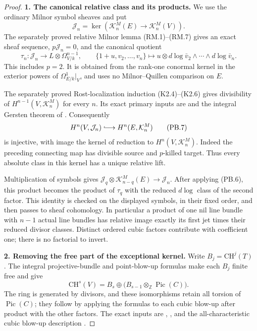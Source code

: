 \begin{proof}
\textbf{1. The canonical relative class and its products.}
We use the ordinary Milnor symbol sheaves and put
\[
 \mathcal J_n=\ker(\mathcal K_n^M(E)\longrightarrow\mathcal K_n^M(V)).
\]
The separately proved relative Milnor lemma (RM.1)--(RM.7) gives
an exact sheaf sequence, $p\mathcal J_n=0$, and the canonical quotient
\[
 \tau_n:\mathcal J_n\longrightarrow L\otimes\Omega^{n-1}_{V/k},
 \qquad
 \{1+u,v_2,\ldots,v_n\}\longmapsto
 u\otimes d\log\bar v_2\wedge\cdots\wedge d\log\bar v_n.
 \tag{PB.6}
\]
This includes $p=2$. It is obtained from the rank-one conormal
kernel in the exterior powers of $\Omega^1_{E/k}|_V$, and uses no
Milnor--Quillen comparison on $E$.

The separately proved Rost-localization induction (K2.4)--(K2.6)
gives divisibility of $H^{n-1}(V,\mathcal K_n^M)$ for every $n$.
Its exact primary inputs are
\citet[Section 5, Corollary 6.5, Proposition 8.6, and Section 12,
pp.~356--360, 370, 382--383]{cyRost1996} and the integral Gersten
theorem of \citet[Theorem 7.1, author pp.~21--22]{cyKerz2009Milnor}.
Consequently
\[
 H^n(V,\mathcal J_n)\lhook\joinrel\longrightarrow
 H^n(E,\mathcal K_n^M)
 \tag{PB.7}
\]
is injective, with image the kernel of reduction to
$H^n(V,\mathcal K_n^M)$. Indeed the preceding connecting map has
divisible source and $p$-killed target. Thus every absolute class
in this kernel has a unique relative lift.

Multiplication of symbols gives
$\mathcal J_q\otimes\mathcal K_{n-q}^M(E)\to\mathcal J_n$.
After applying (PB.6), this product becomes the product of
$\tau_q$ with the reduced $d\log$ class of the second factor.
This identity is checked on the displayed symbols, in their fixed
order, and then passes to sheaf cohomology. In particular a product
of one nil line bundle with $n-1$ actual line bundles has relative
image exactly its first jet times their reduced divisor classes.
Distinct ordered cubic factors contribute with coefficient one;
there is no factorial to invert.

\textbf{2. Removing the free part of the exceptional kernel.}
Write $B_j=\mathrm{CH}^j(T)$. The integral projective-bundle and
point-blow-up formulas make each $B_j$ finite free and give
\[
 \mathrm{CH}^{s}(V)=B_s\oplus
                 \bigl(B_{s-1}\otimes_{\mathbb Z}\operatorname{Pic}(C)\bigr).
 \tag{PB.8}
\]
The ring is generated by divisors, and these isomorphisms retain
all torsion of $\operatorname{Pic}(C)$; they follow by applying the
formulas to each cubic blow-up after product with the other factors.
The exact inputs are
\citet[Theorems 2.4 and 2.8(3)]{cyJiang2023},
\citet[Lemma 42.36.2, Tag 02TX]{cyStacksProject}, and the
all-characteristic cubic blow-up description
\citep[Chapter 4, Proposition 2.4, p.~178]{D_HuybrechtsCubics}.


\end{proof}
